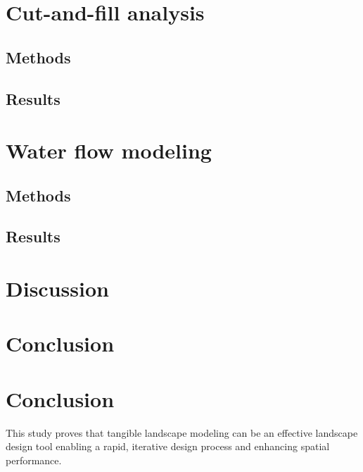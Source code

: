 \documentclass[Afour,sageh,times]{sagej}
\begin{document}
\section{Cut-and-fill analysis}
\subsection{Methods}
\subsection{Results}

\section{Water flow modeling}
\subsection{Methods}
\subsection{Results}

\section{Discussion}


\section{Conclusion}


\clearpage

\section{Conclusion}
This study proves that tangible landscape modeling
can be an effective landscape design tool
enabling a rapid, iterative design process and
enhancing spatial performance.


\end{document}
